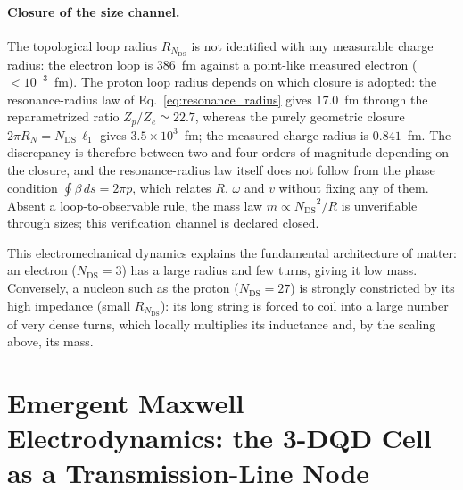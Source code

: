 \documentclass[11pt,a4paper]{article}
\theoremstyle{plain}
\theoremstyle{remark}
\newcommand{\Ncd}{\ensuremath{N_{\mathrm{DS}}}}
\begin{document}
\paragraph{Closure of the size channel.} The topological loop radius $R_{\Ncd}$ is not identified with any measurable charge radius: the electron loop is 386~fm against a point-like measured electron ($<10^{-3}$~fm). The proton loop radius depends on which closure is adopted: the resonance-radius law of Eq.~\eqref{eq:resonance_radius} gives $17.0$~fm through the reparametrized ratio $Z_p/Z_e \simeq 22.7$, whereas the purely geometric closure $2\pi R_N = \Ncd\,\ell_1$ gives $3.5\times10^{3}$~fm; the measured charge radius is $0.841$~fm. The discrepancy is therefore between two and four orders of magnitude depending on the closure, and the resonance-radius law itself does not follow from the phase condition $\oint\beta\,ds = 2\pi p$, which relates $R$, $\omega$ and $v$ without fixing any of them. Absent a loop-to-observable rule, the mass law $m \propto \Ncd^2/R$ is unverifiable through sizes; this verification channel is declared closed.

This electromechanical dynamics explains the fundamental architecture of matter: an electron ($\Ncd=3$) has a large radius and few turns, giving it low mass. Conversely, a nucleon such as the proton ($\Ncd=27$) is strongly constricted by its high impedance (small $R_{\Ncd}$): its long string is forced to coil into a large number of very dense turns, which locally multiplies its inductance and, by the scaling above, its mass.

\section{Emergent Maxwell Electrodynamics: the 3-DQD Cell as a Transmission-Line Node}
\label{sec:maxwell3d}
\end{document}
